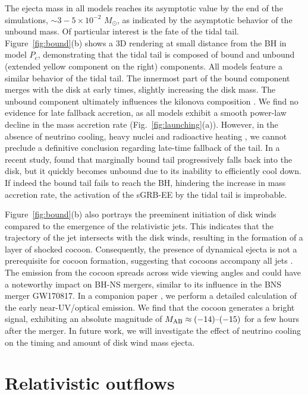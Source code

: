 \documentclass[twocolumn,dvipsnames]{aastex62}
\newcommand{\msun}{\,{M_{\odot}}}
\begin{document}
The ejecta mass in all models reaches its asymptotic value by the end of the simulations, $ \sim 3-5\times 10^{-2}\,\msun $, as indicated by the asymptotic behavior of the unbound mass. Of particular interest is the fate of the tidal tail. Figure~\ref{fig:bound}(b) shows a 3D rendering at small distance from the BH in model $ P_c $, demonstrating that the tidal tail is composed of bound and unbound (extended yellow component on the right) components. All models feature a similar behavior of the tidal tail. The innermost part of the bound component merges with the disk at early times, slightly increasing the disk mass. The unbound component ultimately influences the kilonova composition \citep[see e.g.,][]{Fernandez2017}. We find no evidence for late fallback accretion, as all models exhibit a smooth power-law decline in the mass accretion rate (Fig.~\ref{fig:launching}(a)). However, in the absence of neutrino cooling, heavy nuclei and radioactive heating \citep[e.g.,][]{Desai2019,Haddadi2023}, we cannot preclude a definitive conclusion regarding late-time fallback of the tail. In a recent study, \citet{Metzger2021} found that marginally bound tail progressively falls back into the disk, but it quickly becomes unbound due to its inability to efficiently cool down. If indeed the bound tail fails to reach the BH, hindering the increase in mass accretion rate, the activation of the sGRB-EE by the tidal tail \citep{Metzger2010} is improbable.

Figure~\ref{fig:bound}(b) also portrays the preeminent initiation of disk winds compared to the emergence of the relativistic jets. This indicates that the trajectory of the jet intersects with the disk winds, resulting in the formation of a layer of shocked cocoon. Consequently, the presence of dynamical ejecta is not a prerequisite for cocoon formation, suggesting that cocoons accompany all jets \citep[see also][]{Gottlieb2022d}. The emission from the cocoon spreads across wide viewing angles and could have a noteworthy impact on BH-NS mergers, similar to its influence in the BNS merger GW170817. In a companion paper \citet{Gottlieb2023b}, we perform a detailed calculation of the early near-UV/optical emission. We find that the cocoon generates a bright signal, exhibiting an absolute magnitude of $M_{\rm AB} \approx (-14)\mbox{--}(-15)$ for a few hours after the merger. In future work, we will investigate the effect of neutrino cooling on the timing and amount of disk wind mass ejecta. 


\section{Relativistic outflows}\label{sec:outflow}
\end{document}
